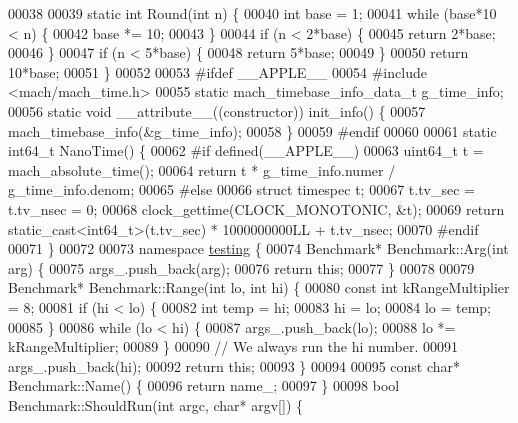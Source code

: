 \begin{DoxyCode}
00038 
00039 \textcolor{keyword}{static} \textcolor{keywordtype}{int} Round(\textcolor{keywordtype}{int} n) \{
00040   \textcolor{keywordtype}{int} base = 1;
00041   \textcolor{keywordflow}{while} (base*10 < n) \{
00042     base *= 10;
00043   \}
00044   \textcolor{keywordflow}{if} (n < 2*base) \{
00045     \textcolor{keywordflow}{return} 2*base;
00046   \}
00047   \textcolor{keywordflow}{if} (n < 5*base) \{
00048     \textcolor{keywordflow}{return} 5*base;
00049   \}
00050   \textcolor{keywordflow}{return} 10*base;
00051 \}
00052 
00053 \textcolor{preprocessor}{#ifdef \_\_APPLE\_\_}
00054 \textcolor{preprocessor}{  #include <mach/mach\_time.h>}
00055   \textcolor{keyword}{static} mach\_timebase\_info\_data\_t g\_time\_info;
00056   \textcolor{keyword}{static} \textcolor{keywordtype}{void} \_\_attribute\_\_((constructor)) init\_info() \{
00057     mach\_timebase\_info(&g\_time\_info);
00058   \}
00059 \textcolor{preprocessor}{#endif}
00060 
00061 \textcolor{keyword}{static} int64\_t NanoTime() \{
00062 \textcolor{preprocessor}{#if defined(\_\_APPLE\_\_)}
00063   uint64\_t t = mach\_absolute\_time();
00064   \textcolor{keywordflow}{return} t * g\_time\_info.numer / g\_time\_info.denom;
00065 \textcolor{preprocessor}{#else}
00066   \textcolor{keyword}{struct }timespec t;
00067   t.tv\_sec = t.tv\_nsec = 0;
00068   clock\_gettime(CLOCK\_MONOTONIC, &t);
00069   \textcolor{keywordflow}{return} \textcolor{keyword}{static\_cast<}int64\_t\textcolor{keyword}{>}(t.tv\_sec) * 1000000000LL + t.tv\_nsec;
00070 #endif
00071 \}
00072 
00073 \textcolor{keyword}{namespace }\hyperlink{namespacetesting}{testing} \{
00074 Benchmark* Benchmark::Arg(\textcolor{keywordtype}{int} arg) \{
00075   args\_.push\_back(arg);
00076   \textcolor{keywordflow}{return} \textcolor{keyword}{this};
00077 \}
00078 
00079 Benchmark* Benchmark::Range(\textcolor{keywordtype}{int} lo, \textcolor{keywordtype}{int} hi) \{
00080   \textcolor{keyword}{const} \textcolor{keywordtype}{int} kRangeMultiplier = 8;
00081   \textcolor{keywordflow}{if} (hi < lo) \{
00082     \textcolor{keywordtype}{int} temp = hi;
00083     hi = lo;
00084     lo = temp;
00085   \}
00086   \textcolor{keywordflow}{while} (lo < hi) \{
00087     args\_.push\_back(lo);
00088     lo *= kRangeMultiplier;
00089   \}
00090   \textcolor{comment}{// We always run the hi number.}
00091   args\_.push\_back(hi);
00092   \textcolor{keywordflow}{return} \textcolor{keyword}{this};
00093 \}
00094 
00095 \textcolor{keyword}{const} \textcolor{keywordtype}{char}* Benchmark::Name() \{
00096   \textcolor{keywordflow}{return} name\_;
00097 \}
00098 \textcolor{keywordtype}{bool} Benchmark::ShouldRun(\textcolor{keywordtype}{int} argc, \textcolor{keywordtype}{char}* argv[]) \{

\end{DoxyCode}
